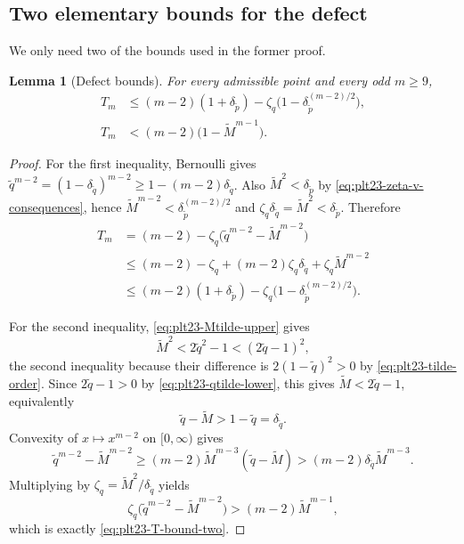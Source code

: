 ﻿\documentclass[11pt]{article}
\newtheorem{lemma}[theorem]{Lemma}
\numberwithin{equation}{section}
\begin{document}
\subsection{Two elementary bounds for the defect}

We only need two of the bounds used in the former proof.

\begin{lemma}[Defect bounds]\label{lem:plt23-T-bounds}
  For every admissible point and every odd $m\ge9$,
  \begin{align}
    T_m
    &\le (m-2)(1+\delta_{\tilde p})-\zeta_q\bigl(1-\delta_{\tilde p}^{(m-2)/2}\bigr),
    \label{eq:plt23-T-bound-one}\\
    T_m
    &<(m-2)\bigl(1-\tilde M^{m-1}\bigr).
    \label{eq:plt23-T-bound-two}
  \end{align}
\end{lemma}

\begin{proof}
  For the first inequality, Bernoulli gives $\tilde q^{m-2}=(1-\delta_{\tilde q})^{m-2}\ge1-(m-2)\delta_{\tilde q}$.
  Also $\tilde M^2<\delta_{\tilde p}$ by \eqref{eq:plt23-zeta-v-consequences}, hence $\tilde M^{m-2}<\delta_{\tilde p}^{(m-2)/2}$ and $\zeta_q\delta_{\tilde q}=\tilde M^2<\delta_{\tilde p}$.
  Therefore
  \begin{align*}
    T_m
    &=(m-2)-\zeta_q\bigl(\tilde q^{m-2}-\tilde M^{m-2}\bigr)\\
    &\le (m-2)-\zeta_q+(m-2)\zeta_q\delta_{\tilde q}+\zeta_q\tilde M^{m-2}\\
    &\le (m-2)(1+\delta_{\tilde p})-\zeta_q\bigl(1-\delta_{\tilde p}^{(m-2)/2}\bigr).
  \end{align*}

  For the second inequality, \eqref{eq:plt23-Mtilde-upper} gives
  \[
    \tilde M^2<2\tilde q^2-1<(2\tilde q-1)^2,
  \]
  the second inequality because their difference is $2(1-\tilde q)^2>0$ by \eqref{eq:plt23-tilde-order}.
  Since $2\tilde q-1>0$ by \eqref{eq:plt23-qtilde-lower}, this gives $\tilde M<2\tilde q-1$, equivalently
  \[
    \tilde q-\tilde M>1-\tilde q=\delta_{\tilde q}.
  \]
  Convexity of $x\mapsto x^{m-2}$ on $[0,\infty)$ gives
  \[
    \tilde q^{m-2}-\tilde M^{m-2}
    \ge (m-2)\tilde M^{m-3}(\tilde q-\tilde M)
    >(m-2)\delta_{\tilde q}\tilde M^{m-3}.
  \]
  Multiplying by $\zeta_q=\tilde M^2/\delta_{\tilde q}$ yields
  \[
    \zeta_q\bigl(\tilde q^{m-2}-\tilde M^{m-2}\bigr)>(m-2)\tilde M^{m-1},
  \]
  which is exactly \eqref{eq:plt23-T-bound-two}.
\end{proof}
\end{document}
